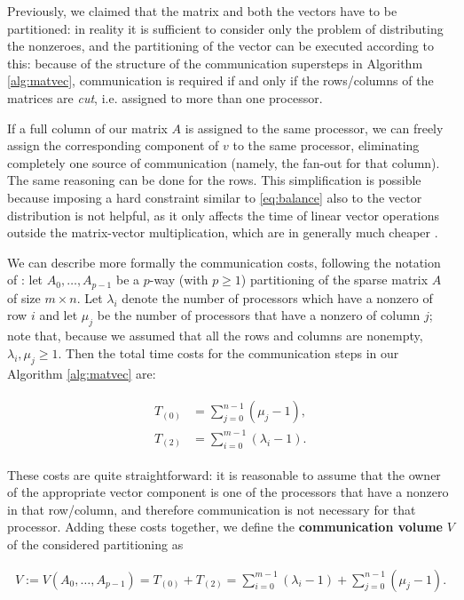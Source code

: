 Previously, we claimed that the matrix and both the vectors have to be partitioned: in reality it is sufficient to consider only the problem of distributing the nonzeroes, and the partitioning of the vector can be executed according to this: because of the structure of the communication supersteps in Algorithm \ref{alg:matvec}, communication is required if and only if the rows/columns of the matrices are \emph{cut}, i.e. assigned to more than one processor.

If a full column of our matrix $A$ is assigned to the same processor, we can freely assign the corresponding component of $v$ to the same processor, eliminating completely one source of communication (namely, the fan-out for that column). The same reasoning can be done for the rows. This simplification is possible because imposing a hard constraint similar to \eqref{eq:balance} also to the vector distribution is not helpful, as it only affects the time of linear vector operations outside the matrix-vector multiplication, which are in generally much cheaper \cite[Sec.~3]{mondriaan}. 

We can describe more formally the communication costs, following the notation of \cite[Def.~2.1]{mondriaan}: let $A_0,\dots,A_{p-1}$ be a $p$-way (with $p \geq 1$) partitioning of the sparse matrix $A$ of size $m \times n$. Let $\lambda_i$ denote the number of processors which have a nonzero of row $i$ and let $\mu_j$ be the number of processors that have a nonzero of column $j$; note that, because we assumed that all the rows and columns are nonempty, $\lambda_i, \mu_j \geq 1$. Then the total time costs for the communication steps in our Algorithm \ref{alg:matvec} are:

\begin{align}
	\begin{aligned}
		T_{(0)} &= \sum_{j=0}^{n-1} (\mu_j -1), \\
		T_{(2)} &= \sum_{i=0}^{m-1} (\lambda_i -1).
	\end{aligned} \label{eq:T_comm}
\end{align}

These costs are quite straightforward: it is reasonable to assume that the owner of the appropriate vector component is one of the processors that have a nonzero in that row/column, and therefore communication is not necessary for that processor. Adding these costs together, we define the \textbf{communication volume} $V$ of the considered partitioning as

\begin{align}
	V := V(A_0,\dots,A_{p-1}) = T_{(0)} + T_{(2)} = \sum_{i=0}^{m-1} (\lambda_i -1) + \sum_{j=0}^{n-1} (\mu_j-1).
	\label{eq:volume}
\end{align}


